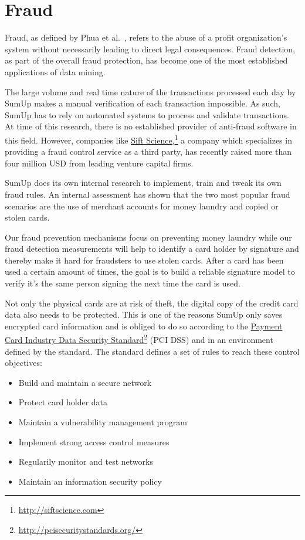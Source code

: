 \documentclass[a4paper, oneside]{csthesis}
\newcommand\fnurl[2]{%
  \href{#2}{#1}\footnote{\url{#2}}%
}
\begin{document}
\section{Fraud}

Fraud, as defined by Phua et al.~\cite{5522816}, refers to the abuse of a profit organization's system without necessarily leading to direct legal consequences. Fraud detection, as part of the overall fraud protection, has become one of the most established applications of data mining.

The large volume and real time nature of the transactions processed each day by SumUp makes a manual verification of each transaction impossible. As such, SumUp has to rely on automated systems to process and validate transactions. At time of this research, there is no established provider of anti-fraud software in this field. However, companies like \fnurl{Sift Science,}{http://siftscience.com} a company which specializes in providing a fraud control service as a third party, has recently raised more than four million USD from leading venture capital firms.

SumUp does its own internal research to implement, train and tweak its own fraud rules. An internal assessment has shown that the two most popular fraud scenarios are the use of merchant accounts for money laundry and copied or stolen cards.

Our fraud prevention mechanisms focus on preventing money laundry while our fraud detection measurements will help to identify a card holder by signature and thereby make it hard for fraudsters to use stolen cards. After a card has been used a certain amount of times, the goal is to  build a reliable signature model to verify it's the same person signing the next time the card is used.

Not only the physical cards are at risk of theft, the digital copy of the credit card data also needs to be protected. This is one of the reasons SumUp only saves encrypted card information and is obliged to do so according to the \fnurl{Payment Card Industry Data Security Standard}{http://pcisecuritystandards.org/} (PCI DSS) and in an environment defined by the standard. The standard defines a set of rules to reach these control objectives:
\begin{itemize}
\item Build and maintain a secure network
\item Protect card holder data
\item Maintain a vulnerability management program
\item Implement strong access control measures
\item Regularily monitor and test networks
\item Maintain an information security policy
\end{itemize}
\end{document}
